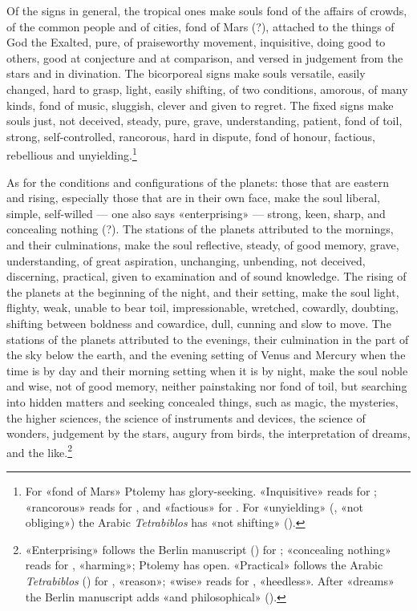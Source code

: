 \documentclass[11pt]{article}
\newcommand{\Fol}[1]{\marginpar{\footnotesize\color{gray}f.\,#1}}
\begin{document}
\par \Fol{55v}Of the signs in general, the tropical ones make souls fond of the affairs of crowds, of the common people and of cities, fond of Mars (?), attached to the things of God the Exalted, pure, of praiseworthy movement, inquisitive, doing good to others, good at conjecture and at comparison, and versed in judgement from the stars and in divination. The bicorporeal signs make souls versatile, easily changed, hard to grasp, light, easily shifting, of two conditions, amorous, of many kinds, fond of music, sluggish, clever and given to regret. The fixed signs make souls just, not deceived, steady, pure, grave, understanding, patient, fond of toil, strong, self-controlled, rancorous, hard in dispute, fond of honour, factious, rebellious and unyielding.\footnote{For «fond of Mars» Ptolemy has glory-seeking. «Inquisitive» reads  for ; «rancorous» reads  for , and «factious»  for . For «unyielding» (, «not obliging») the Arabic \emph{Tetrabiblos} has «not shifting» ().}\par
\par \Fol{56r}As for the conditions and configurations of the planets: those that are eastern and rising, especially those that are in their own face, make the soul liberal, simple, self-willed — one also says «enterprising» — strong, keen, sharp, and concealing nothing (?). The stations of the planets attributed to the mornings, and their culminations, make the soul reflective, steady, of good memory, grave, understanding, of great aspiration, unchanging, unbending, not deceived, discerning, practical, given to examination and of sound knowledge. The rising of the planets at the beginning of the night, and their setting, make the soul light, flighty, weak, unable to bear toil, impressionable, wretched, cowardly, doubting, shifting between boldness and cowardice, dull, cunning and slow to move. The stations of the planets attributed to the evenings, their culmination in the part of the sky below the earth, and the evening setting of Venus and Mercury when the time is by day and their morning setting when it is by night, make the soul noble and wise, not of good memory, neither painstaking nor fond of toil, but searching into hidden matters and seeking concealed things, such as magic, the mysteries, the higher sciences, the science of instruments and devices, the science of wonders, judgement by the stars, augury from birds, the interpretation of dreams, and the like.\footnote{«Enterprising» follows the Berlin manuscript () for ; «concealing nothing» reads  for , «harming»; Ptolemy has open. «Practical» follows the Arabic \emph{Tetrabiblos} () for , «reason»; «wise» reads  for , «heedless». After «dreams» the Berlin manuscript adds «and philosophical» ().}\par
\end{document}
